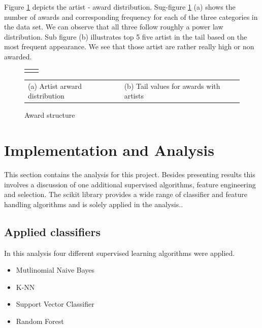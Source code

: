 \documentclass[12pt,a4paper,bibliography=totocnumbered,listof=totocnumbered]{scrartcl}
\begin{document}
Figure \ref{fig:fig1} depicts the artist - award distribution. Sug-figure \ref{fig:fig1} (a) shows the number of awards and corresponding frequency for each of the three categories in the data set. We can observe that all three follow roughly a power law distribution. Sub figure (b) illustrates top 5 five artist in the tail based on the most frequent appearance. We see that those artist are rather really high or non awarded.

\begin{figure}[H]
	\centering
				\small
	\begingroup
	\hspace*{-1.5in}
	\begin{tabular}{p{7cm}p{7cm}}
	 &  
	\end{tabular}
		\hspace*{0in} 	
		\begin{tabular}{p{7cm}p{7cm}}
			\small (a) Artist arward distribution& (b) Tail values for awards with artists \\
		\end{tabular}
	\endgroup
	\caption{Award structure }
	\label{fig:fig1}
\end{figure}

\section{Implementation and Analysis}

This section contains the analysis for this project. Besides presenting results this involves a discussion of one additional supervised algorithms, feature engineering and selection. The scikit library provides a wide range of classifier and feature handling algorithms and is solely applied in the analysis.. 

\subsection{Applied classifiers}

In this analysis four different supervised learning algorithms were applied.

\begin{itemize}
	\itemsep-1em 
	\item Mutlinomial Naive Bayes
	\item K-NN
	\item Support Vector Classifier
	\item Random Forest
\end{itemize}
\end{document}
